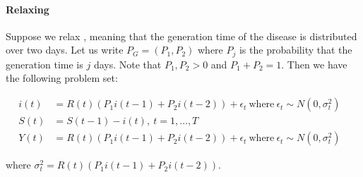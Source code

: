 \paragraph{Relaxing }

Suppose we relax , meaning that the generation time of the disease is distributed over two days.
Let us write $P_{G} = (P_1, P_2)$ where $P_j$ is the probability that the generation time is $j$ days.
Note that $P_1, P_2 > 0$ and $P_1 + P_2 = 1$.
Then we have the following problem set:

\begin{align}
    i(t) & = R(t) \left(P_{1} i(t-1)+P_{2} i(t-2) \right)+\epsilon_{t} ~ \text{where} ~ \epsilon_t \sim N(0, \sigma_t^2) & \\
    S(t) & = S(t - 1) - i(t), ~t=1,\ldots,T & \nonumber \\
    Y(t) & = R(t) \left(P_{1} i(t-1)+P_{2} i(t-2) \right)+\epsilon_{t} ~ \text{where} ~ \epsilon_t \sim N(0, \sigma_t^2)  \label{eq:Y-relax-assm-1} &
\end{align}

where $\sigma_t^2 = R(t) \left(P_{1} i(t-1)+P_{2} i(t-2) \right)$.

